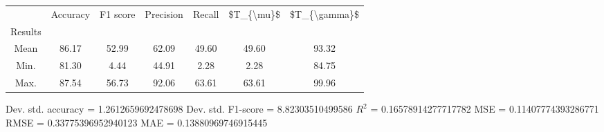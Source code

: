 \begin{tabular}{|c|c|c|c|c|c|c|}
\toprule
{} &  Accuracy &  F1 score &  Precision &  Recall &  \$T\_\{\textbackslash mu\}\$ &  \$T\_\{\textbackslash gamma\}\$ \\
Results &           &           &            &         &            &               \\
\hline
Mean    &     86.17 &     52.99 &      62.09 &   49.60 &      49.60 &         93.32 \\
Min.    &     81.30 &      4.44 &      44.91 &    2.28 &       2.28 &         84.75 \\
Max.    &     87.54 &     56.73 &      92.06 &   63.61 &      63.61 &         99.96 \\
\bottomrule
\end{tabular}

 Dev. std. accuracy = 1.2612659692478698
 Dev. std. F1-score = 8.82303510499586
 $R^2$ = 0.16578914277717782
 MSE = 0.11407774393286771
 RMSE = 0.33775396952940123
 MAE = 0.13880969746915445